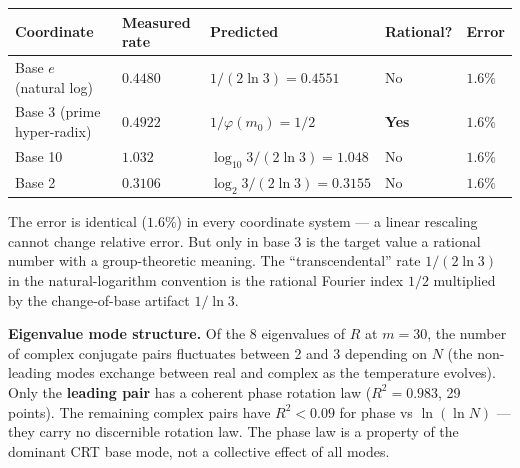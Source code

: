 \documentclass[
  11pt,
]{article}
\newcounter{none} %
\numberwithin{equation}{section}
\begin{document}
{\def\LTcaptype{none} %
\begin{longtable}[]{@{}
  >{\raggedright\arraybackslash}p{}
  >{\centering\arraybackslash}p{}
  >{\centering\arraybackslash}p{}
  >{\centering\arraybackslash}p{}
  >{\centering\arraybackslash}p{}@{}}
\toprule\noalign{}
Coordinate & \begin{minipage}[b]{\linewidth}\centering
Measured rate
\end{minipage} & \begin{minipage}[b]{\linewidth}\centering
Predicted
\end{minipage} & \begin{minipage}[b]{\linewidth}\centering
Rational?
\end{minipage} & \begin{minipage}[b]{\linewidth}\centering
Error
\end{minipage} \\
\midrule\noalign{}
\endhead
\bottomrule\noalign{}
\endlastfoot
Base \(e\) (natural log) & \(0.4480\) & \(1/(2\ln 3) = 0.4551\) & No &
\(1.6\%\) \\
Base 3 (prime hyper-radix) & \(0.4922\) & \(1/\varphi(m_0) = 1/2\) &
\textbf{Yes} & \(1.6\%\) \\
Base 10 & \(1.032\) & \(\log_{10} 3 / (2\ln 3) = 1.048\) & No &
\(1.6\%\) \\
Base 2 & \(0.3106\) & \(\log_2 3/(2\ln 3) = 0.3155\) & No & \(1.6\%\) \\
\end{longtable}
}

The error is identical (\(1.6\%\)) in every coordinate system --- a
linear rescaling cannot change relative error. But only in base 3 is the
target value a rational number with a group-theoretic meaning. The
``transcendental'' rate \(1/(2\ln 3)\) in the natural-logarithm
convention is the rational Fourier index \(1/2\) multiplied by the
change-of-base artifact \(1/\ln 3\).

\textbf{Eigenvalue mode structure.} Of the 8 eigenvalues of \(R\) at
\(m = 30\), the number of complex conjugate pairs fluctuates between 2
and 3 depending on \(N\) (the non-leading modes exchange between real
and complex as the temperature evolves). Only the \textbf{leading pair}
has a coherent phase rotation law (\(R^2 = 0.983\), 29 points). The
remaining complex pairs have \(R^2 < 0.09\) for phase vs \(\ln(\ln N)\)
--- they carry no discernible rotation law. The phase law is a property
of the dominant CRT base mode, not a collective effect of all modes.
\end{document}

